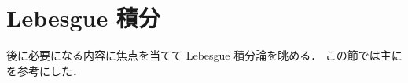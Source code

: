 \section{Lebesgue 積分}

後に必要になる内容に焦点を当てて Lebesgue 積分論を眺める．
この節では主に \cite{Fo99,It63,mpmi} を参考にした．





